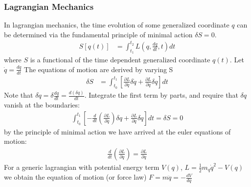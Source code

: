 \subsubsection{Lagrangian Mechanics}

In lagrangian mechanics, the time evolution of some generalized coordinate $q$ can
 be determined via the fundamental principle of minimal action $\delta S = 0$. 
\begin{align*}
S[q(t)] &= \int_{t_1}^{t_2} L \left(q,\frac{dq}{dt},t\right) dt
\end{align*}
where $S$ is a functional of the time dependent generalized coordinate $q(t)$. 
Let $\dot{q} = \frac{dq}{dt}$ The equations of motion are derived by varying S
\begin{align*}
\delta S &= \int_{t_0}^{t_1} \left [ \frac{\partial L}{\partial \dot q}  \delta \dot q + \frac{\partial L}{\partial q} \delta q \right ]dt 
\end{align*}
Note that $\delta \dot q = \delta\frac{dq}{dt} = \frac{d(\delta q)}{dt}$. 
Integrate the first term by parts, and require that $\delta q$ vanish at the boundaries:
\begin{align*}
\int_{t_0}^{t_1} \left [-\frac{d}{dt}\left (\frac{\partial L}{\partial \dot q} \right) \delta q + \frac{\partial L}{\partial q} \delta q \right ] dt  = \delta S = 0
\end{align*}
by the principle of minimal action we have arrived at the euler equations of motion:
\begin{align*}
\frac{d}{dt}\left (\frac{\partial L}{\partial \dot q} \right) = \frac{\partial L}{\partial q}  
\end{align*}
For a generic lagrangian with potential energy term $V(q)$, $L=\frac{1}{2}m_q \dot q^{2} - V(q)$  we obtain the equation of motion (or force law) $F=m\ddot{q}=-\frac{dV}{dq}$ 
